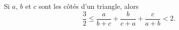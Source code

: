 Si $a$, $b$ et $c$ sont les côtés d'un triangle, alors
\[ \frac{3}{2} \leq \frac{a}{b + c} + \frac{b}{c + a} + \frac{c}{a + b} < 2. \]
